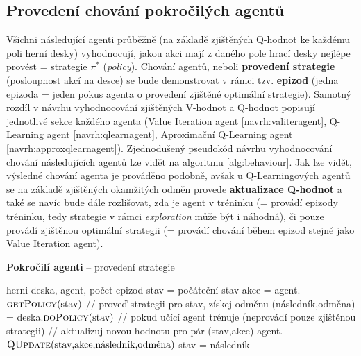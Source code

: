 \subsection*{Provedení chování pokročilých agentů}
Všichni následující agenti průběžně (na základě zjištěných Q-hodnot ke každému poli herní desky) vyhodnocují, jakou akci mají z daného pole hrací desky nejlépe provést = strategie $\pi^*$ (\textit{policy}). Chování agentů, neboli \textbf{provedení strategie} (posloupnost akcí na desce) se bude demonstrovat v rámci tzv. \textbf{epizod} (jedna epizoda = jeden pokus agenta o provedení zjištěné optimální strategie). Samotný rozdíl v návrhu vyhodnocování zjištěných {V-hodnot} a Q-hodnot popisují jednotlivé sekce každého agenta (Value Iteration agent \ref{navrh:valiteragent}, Q-Learning agent \ref{navrh:qlearnagent}, Aproximační Q-Learning agent \ref{navrh:approxqlearnagent}). Zjednodušený pseudokód návrhu vyhodnocování chování následujících agentů lze vidět na algoritmu \ref{alg:behaviour}. Jak lze vidět, výsledné chování agenta je prováděno podobně, avšak u Q-Learningových agentů se na základě zjištěných okamžitých odměn provede \textbf{aktualizace Q-hodnot} a také se navíc bude dále rozlišovat, zda je agent v tréninku (= provádí epizody tréninku, tedy strategie v rámci \textit{exploration} může být i náhodná), či pouze provádí zjištěnou optimální strategii (= provádí chování během epizod stejně jako Value Iteration agent).

\begin{algorithm}
\caption{\textbf{Pokročilí agenti} -- provedení strategie}
\label{alg:behaviour}
\begin{algorithmic}[1]

\Require herni deska, agent, počet epizod
    stav = počáteční stav
      \State akce = agent.$\text{\Call{getPolicy}{stav}}$ 
      \State // proveď strategii pro stav, získej odměnu
      \State (následník,odměna) = deska.$\text{\Call{doPolicy}{stav}}$
      \State // pokud učící agent trénuje (neprovádí pouze zjištěnou strategii)
          \State // aktualizuj novou hodnotu pro pár (stav,akce)
          \State agent.$\text{\Call{QUpdate}{stav,akce,následník,odměna}}$
        \EndIf
      \EndIf
      \State stav = následník
    \EndWhile
  \EndFor
\EndProcedure

\end{algorithmic}
\end{algorithm}


